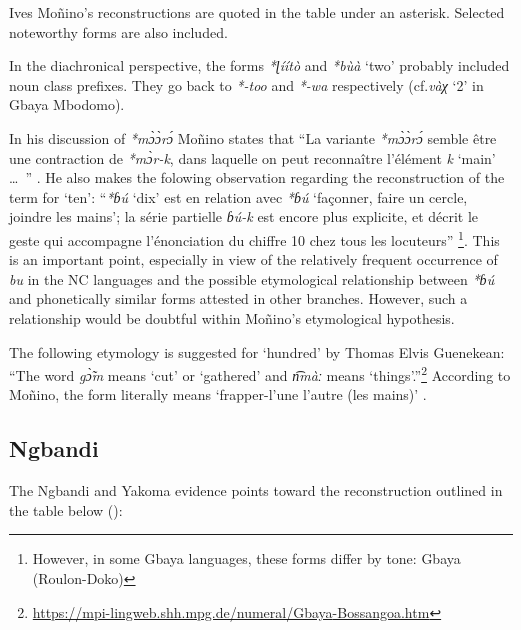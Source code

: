 Ives Moñino’s reconstructions \citep{Moñino1995} are quoted in the table under an asterisk. Selected noteworthy forms are also included.

In the diachronical perspective, the forms \textit{*ɭíítò} and \textit{*b{\`{u}}à} ‘two’ probably included noun class prefixes. They go back to \textit{*-too} and \textit{*-wa} respectively (cf.\textit{vàχ} ‘2’ in Gbaya Mbodomo).

In his discussion of \textit{*m{\`{ɔ}}{\`{ɔ}}r{\'{ɔ}}} Moñino states that “La variante \textit{*m{\`{ɔ}}{\`{ɔ}}r{\'{ɔ}}} semble être une contraction de \textit{*m{\`{ɔ}}r-k{}}, dans laquelle on peut reconnaître l’élément \textit{k{}} ‘main’ …~” \citep[655]{Moñino1995}. He also makes the folowing observation regarding the reconstruction of the term for ‘ten’: “\textit{*ɓ{\'{u}}} ‘dix’ est en relation avec \textit{*ɓ{\'{u}}} ‘façonner, faire un cercle, joindre les mains’; la série partielle \textit{ɓ{\'{u}}-k{}} est encore plus explicite, et décrit le geste qui accompagne l’énonciation du chiffre 10 chez tous les locuteurs” \citep[656]{Moñino1995}\footnote{However, in some Gbaya languages, these forms differ by tone: Gbaya (Roulon-Doko)  }. This is an important point, especially in view of the relatively frequent occurrence of \textit{bu} in the NC languages and the possible etymological relationship between \textit{*ɓ{\'{u}}} and phonetically similar forms attested in other branches. However, such a relationship would be doubtful within Moñino’s etymological hypothesis. 

The following etymology is suggested for ‘hundred’ by Thomas Elvis Guenekean: “The word \textit{g{\`{\~ɔ}}m} means ‘cut’ or ‘gathered’ and \textit{n͡màː} means ‘things’.”\footnote{\href{https://mpi-lingweb.shh.mpg.de/numeral/Gbaya-Bossangoa.htm}{https://mpi-lingweb.shh.mpg.de/numeral/Gbaya}\href{https://mpi-lingweb.shh.mpg.de/numeral/Gbaya-Bossangoa.htm}{-Bossangoa}\href{https://mpi-lingweb.shh.mpg.de/numeral/Gbaya-Bossangoa.htm}{.htm}} According to Moñino, the form literally means ‘frapper-l’une l’autre (les mains)’ \citep[657]{Moñino1995}.

\clearpage
\subsection{Ngbandi}%
The Ngbandi and Yakoma evidence points toward the reconstruction outlined in the table below ():

